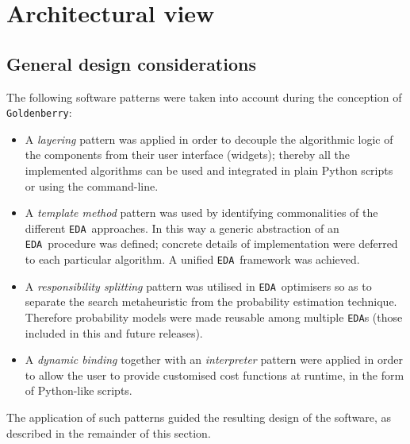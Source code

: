 \documentclass{sig-alternate}
\newcommand{\GB}{\texttt{Goldenberry}}
\newcommand{\EDA}{\texttt{EDA}}
\begin{document}
\section{Architectural view}

\subsection{General design considerations}
\label{sec:patterns}
The following software patterns were taken into account during the conception of \GB:

\begin{itemize}
	\item A \emph{layering} pattern\cite{Buschmann96} was applied in order to decouple the algorithmic logic of the components from their user interface (widgets); thereby all the implemented algorithms can be used and integrated in plain Python scripts or using the command-line. 
	\item A \emph{template method} pattern\cite{GangOfFour} was used by identifying commonalities of the different \EDA~approaches. In this way a generic abstraction of an \EDA~procedure was defined; concrete details of implementation were deferred to each particular algorithm.  A unified \EDA~framework was achieved.
	\item A \emph{responsibility splitting} pattern\cite{Bachmann07} was utilised in \EDA~optimisers so as to separate the search metaheuristic from the probability estimation technique. Therefore probability models were made reusable among multiple \EDA s (those included in this and future releases).
	\item A \emph{dynamic binding}\cite{Bachmann07} together with an \emph{interpreter} pattern\cite{GangOfFour} were applied in order to allow the user to provide customised cost functions at runtime, in the form of Python-like scripts.
\end{itemize}

The application of such patterns guided the resulting design of the software, as described in the remainder of this section.
\end{document}
